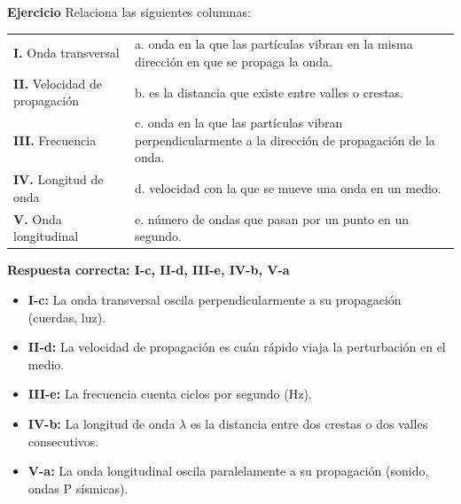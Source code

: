 \newpage
\textbf{Ejercicio} Relaciona las siguientes columnas:

\begin{center}
\begin{tabular}{lp{}}
\textbf{I.}   Onda transversal         & a. onda en la que las partículas vibran en la misma dirección en que se propaga la onda. \\[0.25cm]
\textbf{II.}  Velocidad de propagación & b. es la distancia que existe entre valles o crestas. \\[0.25cm]
\textbf{III.} Frecuencia               & c. onda en la que las partículas vibran perpendicularmente a la dirección de propagación de la onda. \\[0.25cm]
\textbf{IV.}  Longitud de onda         & d. velocidad con la que se mueve una onda en un medio. \\[0.25cm]
\textbf{V.}   Onda longitudinal        & e. número de ondas que pasan por un punto en un segundo. \\
\end{tabular}
\end{center}

\begin{ecuacion}
\textbf{Respuesta correcta: I-c, II-d, III-e, IV-b, V-a}
\begin{itemize}
    \item \textbf{I-c:} La onda transversal oscila perpendicularmente a su propagación (cuerdas, luz).
    \item \textbf{II-d:} La velocidad de propagación es cuán rápido viaja la perturbación en el medio.
    \item \textbf{III-e:} La frecuencia cuenta ciclos por segundo (Hz).
    \item \textbf{IV-b:} La longitud de onda $\lambda$ es la distancia entre dos crestas o dos valles consecutivos.
    \item \textbf{V-a:} La onda longitudinal oscila paralelamente a su propagación (sonido, ondas P sísmicas).
\end{itemize}
\end{ecuacion}




\newpage
